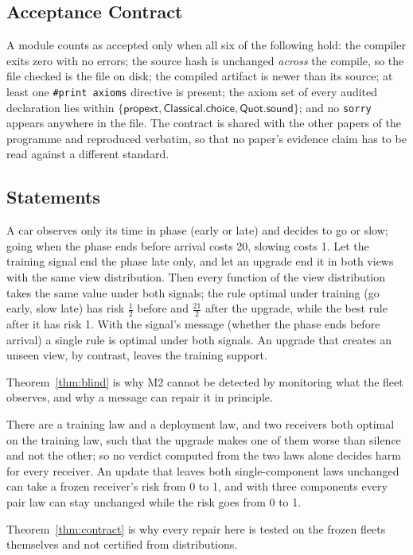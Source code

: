 \subsection{Acceptance Contract}
A module counts as accepted only when all six of the following hold: the compiler exits zero with no errors; the source hash is unchanged
\emph{across} the compile, so the file checked is the file on disk; the compiled artifact is newer than its source; at least one
\texttt{\#print axioms} directive is present; the axiom set of every audited declaration lies within
$\{\textsf{propext},\textsf{Classical.choice},\textsf{Quot.sound}\}$; and no \texttt{sorry} appears anywhere in the file. The contract is
shared with the other papers of the programme and reproduced verbatim, so that no paper's evidence claim has to be read against a
different standard.

\subsection{Statements}
\begin{theorem}\label{thm:blind}
A car observes only its time in phase (early or late) and decides to go or slow; going when the phase ends before arrival costs 20, slowing
costs 1. Let the training signal end the phase late only, and let an upgrade end it in both views with the same view distribution. Then
every function of the view distribution takes the same value under both signals; the rule optimal under training (go early, slow late) has
risk $\tfrac12$ before and $\tfrac{21}{2}$ after the upgrade, while the best rule after it has risk 1. With the signal's message (whether the
phase ends before arrival) a single rule is optimal under both signals. An upgrade that creates an unseen view, by contrast, leaves the
training support.
\end{theorem}
Theorem~\ref{thm:blind} is why M2 cannot be detected by monitoring what the fleet observes, and why a message can repair it in principle.

\begin{theorem}\label{thm:contract}
There are a training law and a deployment law, and two receivers both optimal on the training law, such that the upgrade makes one of them
worse than silence and not the other; so no verdict computed from the two laws alone decides harm for every receiver. An update that leaves
both single-component laws unchanged can take a frozen receiver's risk from 0 to 1, and with three components every pair law can stay
unchanged while the risk goes from 0 to 1.
\end{theorem}
Theorem~\ref{thm:contract} is why every repair here is tested on the frozen fleets themselves and not certified from distributions.

